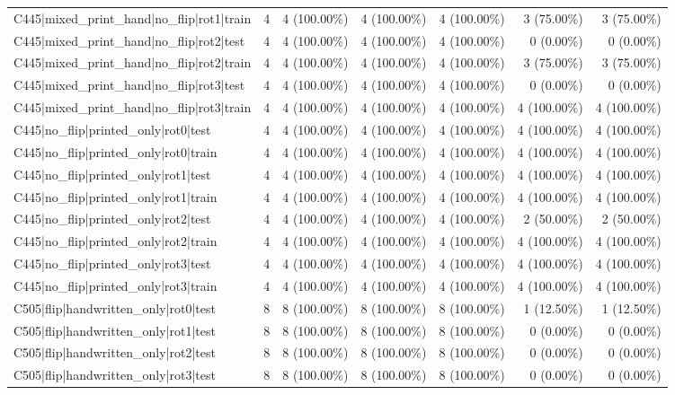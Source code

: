 \begin{longtable}{>{\raggedright\arraybackslash}p{5cm}rrrrrr}
C445|mixed\_print\_hand|no\_flip|rot1|train & 4 & 4 (100.00\%) & 4 (100.00\%) & 4 (100.00\%) & 3 (75.00\%) & 3 (75.00\%) \\
C445|mixed\_print\_hand|no\_flip|rot2|test & 4 & 4 (100.00\%) & 4 (100.00\%) & 4 (100.00\%) & 0 (0.00\%) & 0 (0.00\%) \\
C445|mixed\_print\_hand|no\_flip|rot2|train & 4 & 4 (100.00\%) & 4 (100.00\%) & 4 (100.00\%) & 3 (75.00\%) & 3 (75.00\%) \\
C445|mixed\_print\_hand|no\_flip|rot3|test & 4 & 4 (100.00\%) & 4 (100.00\%) & 4 (100.00\%) & 0 (0.00\%) & 0 (0.00\%) \\
C445|mixed\_print\_hand|no\_flip|rot3|train & 4 & 4 (100.00\%) & 4 (100.00\%) & 4 (100.00\%) & 4 (100.00\%) & 4 (100.00\%) \\
C445|no\_flip|printed\_only|rot0|test & 4 & 4 (100.00\%) & 4 (100.00\%) & 4 (100.00\%) & 4 (100.00\%) & 4 (100.00\%) \\
C445|no\_flip|printed\_only|rot0|train & 4 & 4 (100.00\%) & 4 (100.00\%) & 4 (100.00\%) & 4 (100.00\%) & 4 (100.00\%) \\
C445|no\_flip|printed\_only|rot1|test & 4 & 4 (100.00\%) & 4 (100.00\%) & 4 (100.00\%) & 4 (100.00\%) & 4 (100.00\%) \\
C445|no\_flip|printed\_only|rot1|train & 4 & 4 (100.00\%) & 4 (100.00\%) & 4 (100.00\%) & 4 (100.00\%) & 4 (100.00\%) \\
C445|no\_flip|printed\_only|rot2|test & 4 & 4 (100.00\%) & 4 (100.00\%) & 4 (100.00\%) & 2 (50.00\%) & 2 (50.00\%) \\
C445|no\_flip|printed\_only|rot2|train & 4 & 4 (100.00\%) & 4 (100.00\%) & 4 (100.00\%) & 4 (100.00\%) & 4 (100.00\%) \\
C445|no\_flip|printed\_only|rot3|test & 4 & 4 (100.00\%) & 4 (100.00\%) & 4 (100.00\%) & 4 (100.00\%) & 4 (100.00\%) \\
C445|no\_flip|printed\_only|rot3|train & 4 & 4 (100.00\%) & 4 (100.00\%) & 4 (100.00\%) & 4 (100.00\%) & 4 (100.00\%) \\
C505|flip|handwritten\_only|rot0|test & 8 & 8 (100.00\%) & 8 (100.00\%) & 8 (100.00\%) & 1 (12.50\%) & 1 (12.50\%) \\
C505|flip|handwritten\_only|rot1|test & 8 & 8 (100.00\%) & 8 (100.00\%) & 8 (100.00\%) & 0 (0.00\%) & 0 (0.00\%) \\
C505|flip|handwritten\_only|rot2|test & 8 & 8 (100.00\%) & 8 (100.00\%) & 8 (100.00\%) & 0 (0.00\%) & 0 (0.00\%) \\
C505|flip|handwritten\_only|rot3|test & 8 & 8 (100.00\%) & 8 (100.00\%) & 8 (100.00\%) & 0 (0.00\%) & 0 (0.00\%) \\

\end{longtable}
